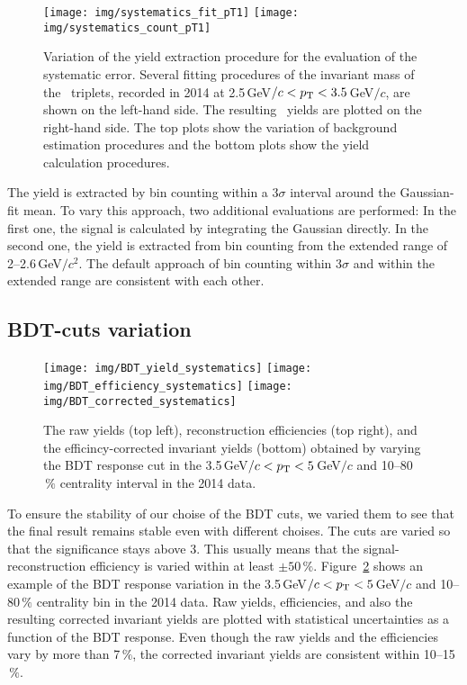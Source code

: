 \begin{figure}[!htb]
\centering
\texttt{[image: img/systematics\_fit\_pT1]}
\texttt{[image: img/systematics\_count\_pT1]}
\caption[Variation of the yield extraction procedure for the evaluation of the systematic error]{\label{syst_pT1} Variation of the yield extraction procedure for the evaluation of the systematic error. Several fitting procedures of the invariant mass of the \pKpi\ triplets, recorded in 2014 at 2.5$\,$GeV$/c < {p_{\mathrm{T}}} < 3.5\,$GeV$/c$, are shown on the left-hand side\@. The resulting \Lambdac\ yields are plotted on the right-hand side. The top plots show the variation of background estimation procedures and the bottom plots show the yield calculation procedures.}
\end{figure}

The yield is extracted by bin counting within a 3$\sigma$ interval around the Gaussian-fit mean. To vary this approach, two additional evaluations are performed: In the first one, the signal is calculated by integrating the Gaussian directly. In the second one, the yield is extracted from bin counting from the extended range of 2--2.6$\,$GeV$/c^2$\@. The default approach of bin counting within 3$\sigma$ and within the extended range are consistent with each other.



\subsection{BDT-cuts variation}

\begin{figure}[!htb]
\centering
\texttt{[image: img/BDT\_yield\_systematics]}
\texttt{[image: img/BDT\_efficiency\_systematics]}
\texttt{[image: img/BDT\_corrected\_systematics]}
\caption[The raw yields, reconstruction efficiencies, and the efficincy-corrected invariant yields obtained by varying the BDT response cut.]{\label{BDT_systematics} The raw yields (top left), reconstruction efficiencies (top right), and the efficincy-corrected invariant yields (bottom) obtained by varying the BDT response cut in the 3.5$\,$GeV$/c < {p_{\mathrm{T}}} < 5\,$GeV$/c$ and 10--80$\,\%$ centrality interval in the 2014 data.}
\end{figure}

To ensure the stability of our choise of the BDT cuts, we varied them to see that the final result remains stable even with different choises. The cuts are varied so that the significance stays above 3\@. This usually means that the signal-reconstruction efficiency is varied within at least $\pm 50\,\%$\@. Figure~\ref{BDT_systematics} shows an example of the BDT response variation in the 3.5$\,$GeV$/c < {p_{\mathrm{T}}} < 5\,$GeV$/c$ and 10--80$\,\%$ centrality bin in the 2014 data. Raw yields, efficiencies, and also the resulting corrected invariant yields are plotted with statistical uncertainties as a function of the BDT response. Even though the raw yields and the efficiencies vary by more than 7$\,\%$, the corrected invariant yields are consistent within 10--15$\,\%$\@.



